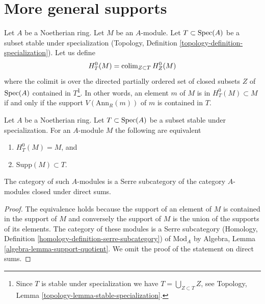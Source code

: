 \section{More general supports}
\label{section-supports}

\noindent
Let $A$ be a Noetherian ring. Let $M$ be an $A$-module.
Let $T \subset \mathop{\mathrm{Spec}}(A)$ be a subset stable under specialization
(Topology, Definition \ref{topology-definition-specialization}).
Let us define
$$
H^0_T(M) = \mathop{\mathrm{colim}}\nolimits_{Z \subset T} H^0_Z(M)
$$
where the colimit is over the directed partially ordered set of
closed subsets $Z$ of $\mathop{\mathrm{Spec}}(A)$ contained in
$T$\footnote{Since $T$ is stable under specialization
we have $T = \bigcup_{Z \subset T} Z$, see
Topology, Lemma \ref{topology-lemma-stable-specialization}.}.
In other words, an element $m$ of $M$ is in $H^0_T(M) \subset M$
if and only if the support $V(\text{Ann}_R(m))$ of $m$
is contained in $T$.

\begin{lemma}
\label{lemma-support}
Let $A$ be a Noetherian ring. Let $T \subset \mathop{\mathrm{Spec}}(A)$ be a subset stable
under specialization. For an $A$-module $M$ the following are equivalent
\begin{enumerate}
\item $H^0_T(M) = M$, and
\item $\text{Supp}(M) \subset T$.
\end{enumerate}
The category of such $A$-modules is a Serre subcategory
of the category $A$-modules closed under direct sums.
\end{lemma}

\begin{proof}
The equivalence holds because the support of an element of $M$
is contained in the support of $M$ and conversely the support of
$M$ is the union of the supports of its elements.
The category of these modules is a Serre subcategory
(Homology, Definition \ref{homology-definition-serre-subcategory})
of $\text{Mod}_A$ by
Algebra, Lemma \ref{algebra-lemma-support-quotient}.
We omit the proof of the statement on direct sums.
\end{proof}

